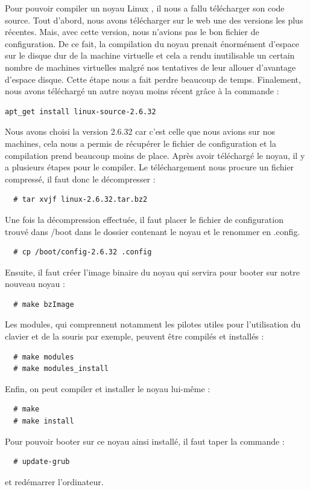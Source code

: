 \documentclass[a4paper]{article}
\begin{document}
Pour pouvoir compiler un noyau Linux \cite{compil}, il nous a fallu télécharger son code source. 
Tout d'abord, nous avons télécharger sur le web une des versions les plus récentes. 
Mais, avec cette version, nous n'avions pas le bon fichier de configuration. De ce fait, 
la compilation du noyau prenait énormément d'espace sur le disque dur de la machine virtuelle 
et cela a rendu inutilisable un certain nombre de machines virtuelles malgré nos tentatives 
de leur allouer d'avantage d'espace disque. Cette étape nous a fait perdre beaucoup de temps.
Finalement, nous avons téléchargé un autre noyau moins récent grâce à la commande :
\begin{verbatim}
apt_get install linux-source-2.6.32
\end{verbatim}
Nous avons choisi la version 2.6.32 car c'est celle que nous avions sur nos machines, 
cela nous a permis de récupérer le fichier de configuration et la compilation prend beaucoup moins de place.
Après avoir téléchargé le noyau, il y a plusieurs étapes pour le compiler. 
Le téléchargement nous procure un fichier compressé, il faut donc le décompresser :
\begin{verbatim}
  # tar xvjf linux-2.6.32.tar.bz2
\end{verbatim}
Une fois la décompression effectuée, il faut placer le fichier de configuration trouvé dans /boot dans le dossier contenant le noyau et le renommer en .config.
\begin{verbatim}
  # cp /boot/config-2.6.32 .config
\end{verbatim}
Ensuite, il faut créer l'image binaire du noyau qui servira pour booter sur notre nouveau noyau :
\begin{verbatim}
  # make bzImage
\end{verbatim}
Les modules, qui comprennent notamment les pilotes utiles pour l'utilisation du clavier et de la souris par exemple, peuvent être compilés et installés :
\begin{verbatim}
  # make modules
  # make modules_install
\end{verbatim}
Enfin, on peut compiler et installer le noyau lui-même :
\begin{verbatim}
  # make
  # make install
\end{verbatim}
Pour pouvoir booter sur ce noyau ainsi installé, il faut taper la commande :
\begin{verbatim}
  # update-grub
\end{verbatim}
et redémarrer l'ordinateur.
\end{document}
